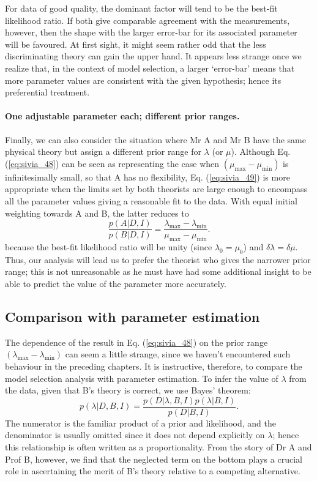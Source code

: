 \documentclass[%
oneside,                 %
final,                   %
10pt]{article}
\begin{document}
For data of good quality, the dominant factor will tend to be the best-fit likelihood ratio. If both give comparable agreement with the measurements, however, then the shape with the larger error-bar for its associated parameter will be favoured. At first sight, it might seem rather odd that the less discriminating theory can gain the upper hand. It appears less strange once we realize that, in the context of model selection, a larger ‘error-bar’ means that more parameter values are consistent with the given hypothesis; hence its preferential treatment.

\paragraph{One adjustable parameter each; different prior ranges.}
Finally, we can also consider the situation where Mr A and Mr B have the same physical theory but assign a different prior range for $\lambda$ (or $\mu$). Although Eq. (\ref{eq:sivia_48}) can be seen as representing the case when $(\mu_\mathrm{max} - \mu_\mathrm{min})$ is infinitesimally small, so that A has no flexibility, Eq. (\ref{eq:sivia_49}) is more appropriate when the limits set by both theorists are large enough to encompass all the parameter values giving a reasonable fit to the data. With equal initial weighting towards A and B, the latter reduces to
$$
\frac{p(A|D,I)}{p(B|D,I)} =  \frac{\lambda_\mathrm{max} - \lambda_\mathrm{min}}{\mu_\mathrm{max} - \mu_\mathrm{min}}. 
$$
because the best-fit likelihood ratio will be unity (since $\lambda_0 = \mu_0$) and $\delta\lambda = \delta\mu$. Thus, our analysis will lead us to prefer the theorist who gives the narrower prior range; this is not unreasonable as he must have had some additional insight to be able to predict the value of the parameter more accurately.

\subsection{Comparison with parameter estimation}
The dependence of the result in Eq. (\ref{eq:sivia_48}) on the prior range $(\lambda_\mathrm{max} - \lambda_\mathrm{min})$ can seem a little strange, since we haven’t encountered such behaviour in the preceding chapters. It is instructive, therefore, to compare the model selection analysis with parameter estimation. To infer the value of $\lambda$ from the data, given that B’s theory is correct, we use Bayes’ theorem:
\begin{equation}
p(\lambda|D,B,I) = \frac{p(D|\lambda,B,I) p(\lambda|B,I)}{p(D|B,I)}. 
\label{eq:sivia_410}
\end{equation}
The numerator is the familiar product of a prior and likelihood, and the denominator is usually omitted since it does not depend explicitly on $\lambda$; hence this relationship is often written as a proportionality. From the story of Dr A and Prof B, however, we find that the neglected term on the bottom plays a crucial role in ascertaining the merit of B’s theory relative to a competing alternative. 
\end{document}
